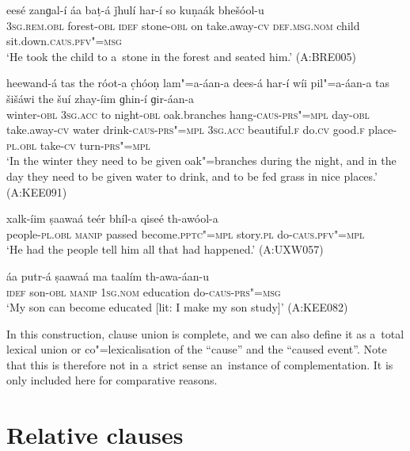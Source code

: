 \begin{exe}
\ex
\label{ex:13-184}
\gll eesé zanɡal-í áa baṭ-á ǰhulí har-í  so kuṇaák bhešóol-u \\
\textsc{3sg.rem.obl} forest-\textsc{obl} \textsc{idef} stone-\textsc{obl} on take.away-\textsc{cv} \textsc{def.msg.nom} child sit.down.\textsc{caus}.\textsc{pfv"=msg} \\
\glt `He took the child to a~stone in the forest and seated him.' (A:BRE005)

\ex
\label{ex:13-185}
\gll heewand-á tas the róot-a c̣hóoṇ  lam"=a-áan-a dees-á har-í wíi
pil"=a-áan-a tas šišáwi the šuí zhay-íim  ɡhin-í ɡir-áan-a\\
winter-\textsc{obl}  \textsc{3sg.acc}  to night-\textsc{obl} oak.branches  hang-\textsc{caus}-\textsc{prs"=mpl} day-\textsc{obl} take.away-\textsc{cv} water  drink-\textsc{caus}-\textsc{prs"=mpl} \textsc{3sg.acc} beautiful.\textsc{f} do.\textsc{cv} good.\textsc{f} place-\textsc{pl.obl} take-\textsc{cv} turn-\textsc{prs"=mpl} \\
\glt `In the winter they need to be given oak"=branches during the night, and in the day they need to be given water to drink, and to be fed grass in nice places.' (A:KEE091)

\ex
\label{ex:13-186}
\gll xalk-íim ṣaawaá teér bhíl-a qiseé  th-awóol-a\\
people-\textsc{pl.obl} \textsc{manip} passed become.\textsc{pptc"=mpl} story.\textsc{pl} do-\textsc{caus}.\textsc{pfv"=mpl}\\
\glt `He had the people tell him all that had happened.' (A:UXW057)

\ex
\label{ex:13-187}
\gll áa putr-á ṣaawaá ma taalím th-awa-áan-u  \\
\textsc{idef} son-\textsc{obl} \textsc{manip} \textsc{1sg.nom} education do-\textsc{caus}-\textsc{prs"=msg} \\
\glt `My son can become educated [lit: I make my son study]' (A:KEE082) 
\end{exe}

In this construction, clause union is complete, and we can also define it as a~total lexical union \citep[86]{noonan2007} or co"=lexicalisation of the ``cause'' and the ``caused event''. Note that this is therefore not in a~strict sense an~instance of complementation. It is only included here for comparative reasons.


\section{Relative clauses}
\label{sec:13-6}


